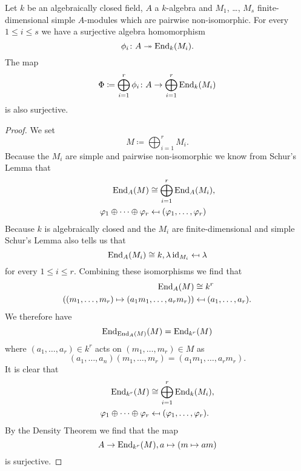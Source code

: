 \begin{lem}\label{lem: map into sum endomorphisms surjective}
  Let $k$ be an algebraically closed field, $A$ a $k$-algebra and $M_1$, \dots, $M_s$ finite-dimensional simple $A$-modules which are pairwise non-isomorphic.
  For every $1 \leq i \leq s$ we have a surjective algebra homomorphism
  \[
                        \phi_i
    \colon              A
    \twoheadrightarrow  \operatorname{End}_k(M_i).
  \]
  The map
  \[
              \Phi
    \coloneqq \bigoplus_{i=1}^r \phi_i
    \colon    A
    \to       \bigoplus_{i=1}^r \operatorname{End}_k(M_i)
  \]
  is also surjective.
\end{lem}
\begin{proof}
  We set
  \[
    M \coloneqq \bigoplus_{i=1}^r M_i.
  \]
  Because the $M_i$ are simple and pairwise non-isomorphic we know from Schur’s Lemma that
  \begin{align*}
                \operatorname{End}_A(M)
    &\cong      \bigoplus_{i=1}^r \operatorname{End}_A(M_i), \\
                \varphi_1 \oplus \dotsb \oplus \varphi_r
    &\mapsfrom  (\varphi_1, \dotsc, \varphi_r)
  \end{align*}
  Because $k$ is algebraically closed and the $M_i$ are finite-dimensional and simple Schur’s Lemma also tells us that
  \[
              \operatorname{End}_A(M_i)
    \cong     k,
              \lambda \operatorname{id}_{M_i}
    \mapsfrom \lambda
  \]
  for every $1 \leq i \leq r$.
  Combining these isomorphisms we find that
  \begin{align*}
                \operatorname{End}_A(M)
    &\cong      k^r \\
                (
                          (m_1, \dotsc, m_r)
                  \mapsto (a_1 m_1, \dotsc, a_r m_r)
                )
    &\mapsfrom  (a_1, \dotsc, a_r).
  \end{align*}
  We therefore have
  \[
      \operatorname{End}_{\operatorname{End}_A(M)}(M)
    = \operatorname{End}_{k^r}(M)
  \]
  where $(a_1, \dotsc, a_r) \in k^r$ acts on $(m_1, \dotsc, m_r) \in M$ as
  \[
      (a_1, \dotsc, a_n)(m_1, \dotsc, m_r)
    = (a_1 m_1, \dotsc, a_r m_r).
  \]
  It is clear that
  \begin{align*}
                \operatorname{End}_{k^r}(M)
    &\cong      \bigoplus_{i=1}^r \operatorname{End}_k(M_i), \\
                \varphi_1 \oplus \dotsb \oplus \varphi_r
    &\mapsfrom  (\varphi_1, \dotsc, \varphi_r).
  \end{align*}
  By the Density Theorem we find that the map
  \[
            A
    \to     \operatorname{End}_{k^r}(M),
            a
    \mapsto (m \mapsto am)
  \]
  is surjective.

\end{proof}
